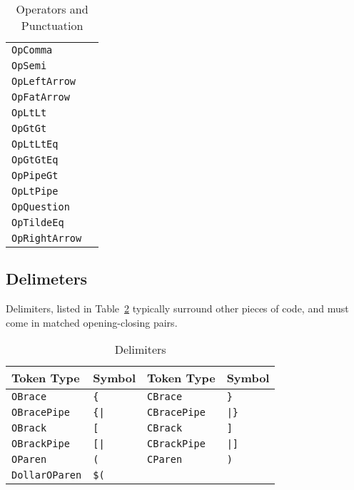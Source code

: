 \begin{table}[h]
{\begin{tabular}[t]{ll}
        \texttt{OpComma} & \op{,} \\
        \texttt{OpSemi} & \op{;} \\
        \texttt{OpLeftArrow} & \op{<-} \\
        \texttt{OpFatArrow} & \op{=>} \\
        \hline
        \texttt{OpLtLt} & \op{<<} \\
        \texttt{OpGtGt} & \op{>>} \\
        \texttt{OpLtLtEq} & \op{<<=} \\
        \texttt{OpGtGtEq} & \op{>>=} \\
        \texttt{OpPipeGt} & \op{|>} \\
        \texttt{OpLtPipe} & \op{<|} \\
        \hline
        \texttt{OpQuestion} & \op{?} \\
        \texttt{OpTildeEq} & \op{\textasciitilde=} \\
        \texttt{OpRightArrow} & \op{->} \\
        \hline
    \end{tabular}
}
\caption{\label{tab:operators}Operators and Punctuation}
\end{table}

\subsection{Delimeters}

Delimiters, listed in Table~\ref{tab:delimiters} typically surround other
pieces of code, and must come in matched opening-closing pairs.

\begin{table}[h]
    \centering
    \begin{tabular}[t]{llll}
        \hline
        \textbf{Token Type} & \textbf{Symbol}& \textbf{Token Type} & \textbf{Symbol} \\
        \hline
        \texttt{OBrace} & \texttt{\{}& \texttt{CBrace} & \texttt{\}} \\
        \texttt{OBracePipe} & \texttt{\{|}& \texttt{CBracePipe} & \texttt{|\}} \\
        \texttt{OBrack} & \texttt{[} & \texttt{CBrack} & \texttt{]} \\
        \texttt{OBrackPipe} & \texttt{[|}& \texttt{CBrackPipe} & \texttt{|]} \\
        \texttt{OParen} & \texttt{(} & \texttt{CParen} & \texttt{)} \\
        \texttt{DollarOParen} & \texttt{\$(} & & \\ %
        \hline
    \end{tabular}
    \caption{\label{tab:delimiters}Delimiters}
\end{table}

